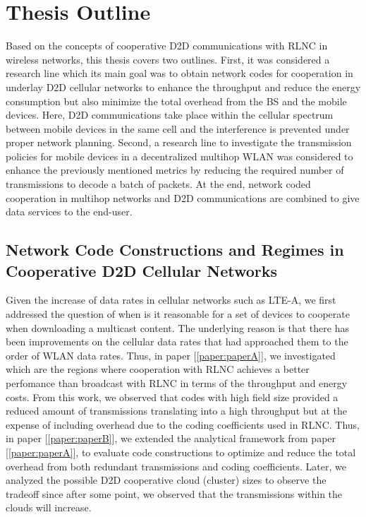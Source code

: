 \section{Thesis Outline}\label{sec:intro_thesis_outline}

Based on the concepts of cooperative \ac{D2D} communications with \ac{RLNC} in wireless networks, this thesis covers two outlines. First, it was considered a research line which its main goal was to obtain network codes for cooperation in underlay \ac{D2D} cellular networks to enhance the throughput and reduce the energy consumption but also minimize the total overhead from the \ac{BS} and the mobile devices. Here, \ac{D2D} communications take place within the cellular spectrum between mobile devices in the same cell and the interference is prevented under proper network planning. Second, a research line to investigate the transmission policies for mobile devices in a decentralized multihop \ac{WLAN} was considered to enhance the previously mentioned metrics by reducing the required number of transmissions to decode a batch of packets. At the end, network coded cooperation in multihop networks and \ac{D2D} communications are combined to give data services to the end-user.

\subsection{Network Code Constructions and Regimes in Cooperative D2D Cellular Networks}

Given the increase of data rates in cellular networks such as \ac{LTE-A}, we first addressed the question of when is it reasonable for a set of devices to cooperate when downloading a multicast content. The underlying reason is that there has been improvements on the cellular data rates that had approached them to the order of \ac{WLAN} data rates. Thus, in paper {[\ref{paper:paperA}]}, we investigated which are the regions where cooperation with \ac{RLNC} achieves a better perfomance than broadcast with \ac{RLNC} in terms of the throughput and energy costs. From this work, we observed that codes with high field size provided a reduced amount of transmissions translating into a high throughput but at the expense of including overhead due to the coding coefficients used in \ac{RLNC}. Thus, in paper {[\ref{paper:paperB}]}, we extended the analytical framework from paper {[\ref{paper:paperA}]}, to evaluate code constructions to optimize and reduce the total overhead from both redundant transmissions and coding coefficients. Later, we analyzed the possible \ac{D2D} cooperative cloud (cluster) sizes to observe the tradeoff since after some point, we observed that the transmissions within the clouds will increase.

